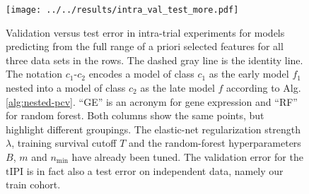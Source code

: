 \begin{figure}
    \centering
    \texttt{[image: ../../results/intra\_val\_test\_more.pdf]}
    \caption{Validation versus test error in intra-trial experiments for models predicting from the 
        full range of a priori selected features for all three data sets in the rows. The dashed 
        gray line is the identity line. The notation 
        $c_1$-$c_2$ encodes a model of class $c_1$ as the early model $f_1$ nested into a model of 
        class $c_2$ as the late model $f$ according to Alg. \ref{alg:nested-pcv}.
        ``GE'' is an acronym for gene expression and ``RF'' for random forest. Both columns show 
        the same points, but highlight different groupings. The elastic-net 
        regularization strength $\lambda$, training survival cutoff $T$ and the random-forest 
        hyperparameters $B$, $m$ and $n_\text{min}$ have already been tuned. The validation error 
        for the $\text{tIPI}$ is in fact also a test error on independent data, namely our train 
        cohort.}
    \label{fig:intra-val-test-more}
\end{figure}